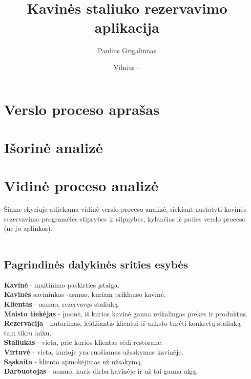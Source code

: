 \documentclass{VUMIFPSkursinis}
\title{Kavinės staliuko rezervavimo aplikacija}
\author{Paulius Grigaliūnas}
\date{Vilnius – \the\year}
\begin{document}
\maketitle
\cleardoublepage{}
\setcounter{page}{2}



\noindent


\tableofcontents

\noindent

\section{Verslo proceso aprašas}

\section{Išorinė analizė}

\section{Vidinė proceso analizė}

Šiame skyriuje atliekama vidinė verslo proceso analizė, siekiant nustatyti kavinės rezervavimo programėles stiprybes ir silpnybes, kylančias iš paties verslo proceso (ne jo aplinkos).\\\\

\subsection{Pagrindinės dalykinės srities esybės}
\noindent \textbf{Kavinė} - maitinimo paskirties įstaiga.\\
\textbf{Kavinės} savininkas -asmuo, kuriam priklauso kavinė.\\
\textbf{Klientas} - asmuo, rezervavęs staliuką. \\
\textbf{Maisto tiekėjas} - įmonė, iš kurios kavinė gauna reikalingas prekes ir produktus. \\
\textbf{Rezervacija} - nutarimas, leidžiantis klientui iš anksto turėti konkretų staliuką tam tikru laiku. \\
\textbf{Staliukas} - vieta, prie kurios klientas sėdi restorane.\\
\textbf{Virtuvė} - vieta, kurioje yra ruošiamas užsakymas kavinėje.\\
\textbf{Sąskaita} - kliento apmokėjimas už užsakymą.\\
\textbf{Darbuotojas} - asmuo, kuris dirba kavinėje ir už tai gauna algą.\\
\end{document}
